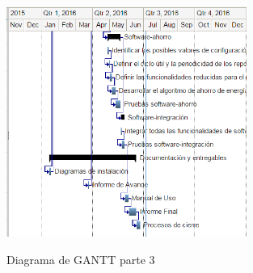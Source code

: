 \begin{figure}[h!]
	\centering
    \includegraphics[width=0.7\textwidth]{./Figures/gantt3.PNG}
	\label{fig:gantt3}
	\caption{Diagrama de GANTT parte 3}
\end{figure}
